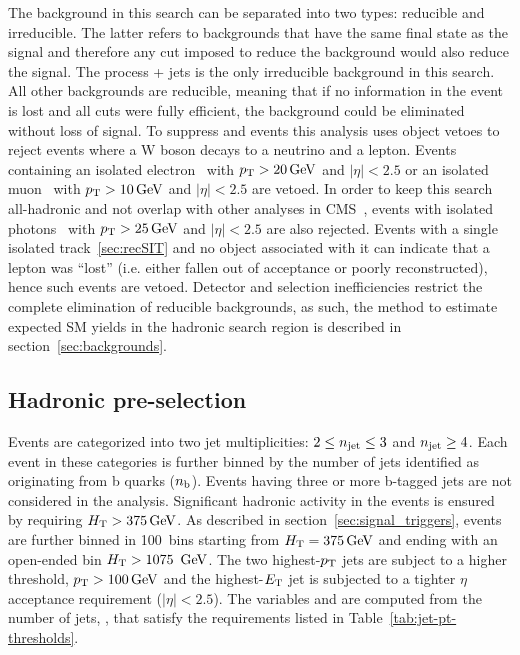 The background in this search can be separated into two types: 
reducible and irreducible. The latter refers to backgrounds that 
have the same final state as the signal and therefore any cut imposed 
to reduce the background would also reduce the signal. The process 
\znunu + jets is the only irreducible background in this search. 
All other backgrounds are reducible, meaning that if no information 
in the event is lost and all cuts were fully efficient, the background 
could be eliminated without loss of signal. To suppress \wj and \ttbar
events this analysis uses object vetoes to reject events where a W boson 
decays to a neutrino and a lepton. Events containing 
an isolated electron~\cite{PAS-EGM-10-004} with $p_{\mathrm{T}} > 20\,\text{Ge\hspace{-.08em}V}$ 
and $|\eta| < 2.5$ or an isolated muon~\cite{PAS-MUO-10-002}
with $p_{\mathrm{T}} > 10\,\text{Ge\hspace{-.08em}V}$ and $|\eta| < 2.5$ are vetoed. In order to keep this 
search all-hadronic and not overlap with other analyses in 
CMS~\cite{CMS-PAS-SUS-14-008,photon7TeV}, events with isolated 
photons~\cite{PAS-EGM-10-006} with $p_{\mathrm{T}} > 25\,\text{Ge\hspace{-.08em}V}$ 
and $|\eta| < 2.5$ are also rejected. Events with a single isolated 
track~\ref{sec:recSIT} and no object associated with it can indicate that
a lepton was ``lost'' (i.e. either fallen out of acceptance or poorly 
reconstructed), hence such events are vetoed. Detector and selection 
inefficiencies restrict the complete elimination of reducible backgrounds, 
as such, the method to estimate expected SM yields in the hadronic search
region is described in section~\ref{sec:backgrounds}.

\subsection{Hadronic pre-selection}

Events are categorized into two jet multiplicities: $2 \leq n_{\text{jet}} \leq 3$ and 
$n_{\text{jet}} \geq 4$.  Each event in these categories is further binned by the number
of jets identified as originating from b quarks ($n_{\text{b}}$). Events having 
three or more b-tagged jets are not considered in the analysis.      
Significant hadronic activity in the events is ensured by requiring
$\mbox{$H_\text{T}$} > 375\,\text{Ge\hspace{-.08em}V}$. As described in section~\ref{sec:signal_triggers}, events are further
binned in 100~\gev bins starting from $\mbox{$H_\text{T}$} = 375\,\text{Ge\hspace{-.08em}V}$ and ending with 
an open-ended bin $\mbox{$H_\text{T}$} > 1075~\,\text{Ge\hspace{-.08em}V}$. The two highest-$p_{\mathrm{T}}$ jets are 
subject to a higher threshold, $p_{\mathrm{T}}>100\,\text{Ge\hspace{-.08em}V}$ and the highest-${E_{\text T}}$ jet 
is subjected to a tighter $\eta$ acceptance requirement ($|\eta| < 2.5$). 
The variables \scalht and \mht are computed from the number of jets, 
\njet, that satisfy the \pt requirements listed in Table~\ref{tab:jet-pt-thresholds}. 

